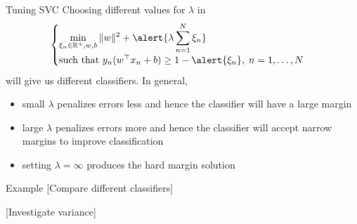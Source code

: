 \documentclass[12pt,t]{beamer}
\begin{document}
\begin{frame}{Tuning SVC} 
\vskip-0.4cm
\small
Choosing different values for $\lambda$ in 
\[
\begin{cases}
\displaystyle \min_{\xi_n \in \mathbb{R}^{+}, w, b} \|w\|^2 + \alert{\lambda\sum_{n=1}^N \xi_n}\\
\text{such that } y_n(w^\top x_n + b) \geq 1 - \alert{\xi_n}, \; n = 1, \ldots, N
\end{cases}
\]
will give us different classifiers.
\vskip0.2cm
In general, 
\begin{itemize}
\item small $\lambda$ penalizes errors less and hence the classifier will have a large margin
\item large $\lambda$ penalizes errors more and hence the classifier will accept narrow margins to improve classification
\item setting $\lambda = \infty$ produces the hard margin solution
\end{itemize}
\end{frame}

\begin{frame}{Example} 
[Compare different classifiers]

[Investigate variance]
\end{frame}
\end{document}
